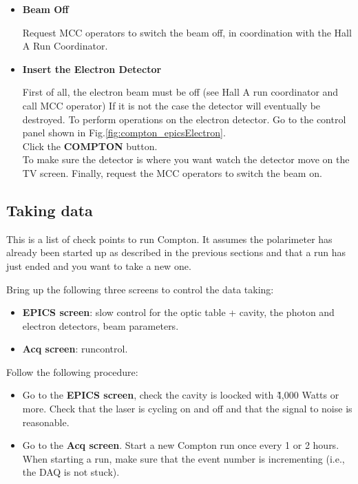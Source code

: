 {\begin{itemize}
\item {\bf Beam Off}

Request  MCC operators to switch the beam off, in coordination with the Hall A Run Coordinator.

\item {\bf Insert the Electron Detector }

First of all, the electron beam must
be off (see Hall A run coordinator and call MCC operator)
If it is not the case the detector will eventually be destroyed.
To perform operations on the electron detector. Go to the control panel  shown in 
Fig.\ref{fig:compton_epicsElectron}.\\

Click the {\bf COMPTON} button.\\

To make sure the detector is where you want watch the detector move on the TV screen. 
Finally, request  the MCC operators to switch the beam on.
\end{itemize}

\subsection{Taking data}
This is a list of check points to run Compton. It assumes the polarimeter 
has already been started up as described in the previous sections and  
that a run has just ended and you want to take a 
new one.

Bring up the  following three screens to control the data taking:

\begin{itemize}
\item {\bf EPICS screen}: slow control for the optic table + cavity, the 
photon and electron detectors, beam parameters.
\item {\bf Acq screen}: runcontrol.
 \end{itemize}

Follow the following procedure:
\begin{itemize}
\item Go to the {\bf EPICS screen}, check the cavity is loocked with \~4,000 Watts 
or more. Check that the laser is cycling on and off and that the signal to noise is reasonable.
\item Go to the {\bf Acq screen}. Start a new Compton run once every 1 or 2 hours. When starting a run,
make sure that the event number is incrementing (i.e., the DAQ is not stuck).
\end{itemize}

}

